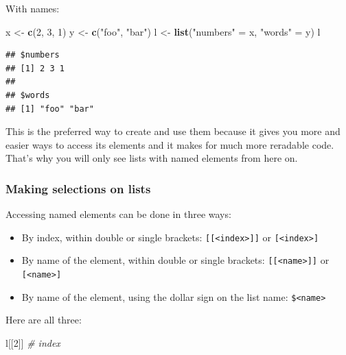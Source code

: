 \documentclass[]{book}
\newenvironment{Shaded}{\begin{snugshade}}{\end{snugshade}}
\newcommand{\CommentTok}[1]{\textcolor[rgb]{0.56,0.35,0.01}{\textit{#1}}}
\newcommand{\DecValTok}[1]{\textcolor[rgb]{0.00,0.00,0.81}{#1}}
\newcommand{\KeywordTok}[1]{\textcolor[rgb]{0.13,0.29,0.53}{\textbf{#1}}}
\newcommand{\NormalTok}[1]{#1}
\newcommand{\StringTok}[1]{\textcolor[rgb]{0.31,0.60,0.02}{#1}}
\providecommand{\tightlist}{%
  \setlength{\itemsep}{0pt}\setlength{\parskip}{0pt}}
\begin{document}
With names:

\begin{Shaded}
\begin{Highlighting}[]
\NormalTok{x <-}\StringTok{ }\KeywordTok{c}\NormalTok{(}\DecValTok{2}\NormalTok{, }\DecValTok{3}\NormalTok{, }\DecValTok{1}\NormalTok{)}
\NormalTok{y <-}\StringTok{ }\KeywordTok{c}\NormalTok{(}\StringTok{"foo"}\NormalTok{, }\StringTok{"bar"}\NormalTok{)}
\NormalTok{l <-}\StringTok{ }\KeywordTok{list}\NormalTok{(}\StringTok{"numbers"}\NormalTok{ =}\StringTok{ }\NormalTok{x, }\StringTok{"words"}\NormalTok{ =}\StringTok{ }\NormalTok{y)}
\NormalTok{l}
\end{Highlighting}
\end{Shaded}

\begin{verbatim}
## $numbers
## [1] 2 3 1
## 
## $words
## [1] "foo" "bar"
\end{verbatim}

This is the preferred way to create and use them because it gives you more and easier ways to access its elements and it makes for much more reradable code. That's why you will only see lists with named elements from here on.

\hypertarget{making-selections-on-lists}{%
\subsubsection*{Making selections on lists}\label{making-selections-on-lists}}

Accessing named elements can be done in three ways:

\begin{itemize}
\tightlist
\item
  By index, within double or single brackets: \texttt{{[}{[}\textless{}index\textgreater{}{]}{]}} or \texttt{{[}\textless{}index\textgreater{}{]}}
\item
  By name of the element, within double or single brackets: \texttt{{[}{[}\textless{}name\textgreater{}{]}{]}} or \texttt{{[}\textless{}name\textgreater{}{]}}
\item
  By name of the element, using the dollar sign on the list name: \texttt{\$\textless{}name\textgreater{}}
\end{itemize}

Here are all three:

\begin{Shaded}
\begin{Highlighting}[]
\NormalTok{l[[}\DecValTok{2}\NormalTok{]]        }\CommentTok{# index}
\end{Highlighting}
\end{Shaded}
\end{document}
